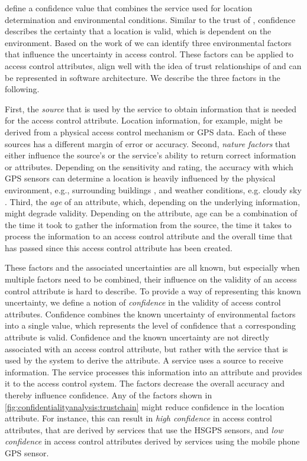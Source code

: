 \textcite{ardagna_supporting_2006} define a confidence value that combines the service used for location determination and environmental conditions. Similar to the trust of \textcite{hu_guide_2014}, confidence describes the certainty that a location is valid, which is dependent on the environment.
Based on the work of \textcite{hengartner_distributed_2007} we can identify three environmental factors that influence the uncertainty in access control. 
These factors can be applied to access control attributes, align well with the idea of trust relationships of \textcite{hu_guide_2014} and can be represented in software architecture.
We describe the three factors in the following.

First, the \emph{source} that is used by the service to obtain information that is needed for the access control attribute. 
Location information, for example, might be derived from a physical access control mechanism or GPS data. 
Each of these sources has a different margin of error or accuracy.
Second, \emph{nature factors} that either influence the source's or the service's ability to return correct information or attributes.
Depending on the sensitivity and rating, the accuracy with which GPS sensors can determine a location is heavily influenced by the physical environment, e.g., surrounding buildings \cite{kjaergaard_indoor_2010}, and weather conditions, e.g. cloudy sky \cite{ardagna_supporting_2006}.
Third, the \emph{age} of an attribute, which, depending on the underlying information, might degrade validity. 
Depending on the attribute, age can be a combination of the time it took to gather the information from the source, the time it takes to process the information to an access control attribute and the overall time that has passed since this access control attribute has been created.

These factors and the associated uncertainties are all known, but especially when multiple factors need to be combined, their influence on the validity of an access control attribute is hard to describe. 
To provide a way of representing this known uncertainty, we define a notion of \emph{confidence} in the validity of access control attributes.
Confidence combines the known uncertainty of environmental factors into a single value, which represents the level of confidence that a corresponding attribute is valid. 
Confidence and the known uncertainty are not directly associated with an access control attribute, but rather with the service that is used by the system to derive the attribute. 
A service uses a source to receive information. 
The service processes this information into an attribute and provides it to the access control system.
The factors decrease the overall accuracy and thereby influence confidence. 
Any of the factors shown in \autoref{fig:confidentialityanalysis:trustchain} might reduce confidence in the location attribute.
For instance, this can result in \emph{high confidence} in access control attributes, that are derived by services that use the HSGPS sensors, and \emph{low confidence} in access control attributes derived by services using the mobile phone GPS sensor.

